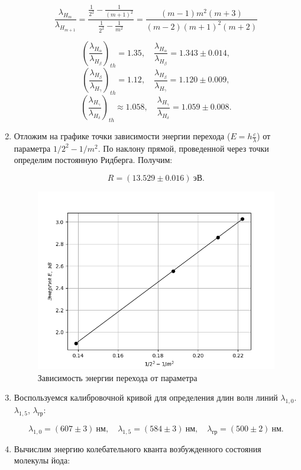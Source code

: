 \documentclass[14pt, a4paper]{report}
\begin{document}
\begin{enumerate}
\[\frac{\lambda_{H_m}}{\lambda_{H_{m+1}}}=\frac{\frac{1}{2^2}-\frac{1}{(m+1)^2}}{\frac{1}{2^2}-\frac{1}{m^2}}=\frac{(m-1)m^2(m+3)}{(m-2)(m+1)^2(m+2)}\]

\[\left(\frac{\lambda_{H_\alpha}}{\lambda_{H_\beta}}\right)_{th}=1.35,\quad\frac{\lambda_{H_\alpha}}{\lambda_{H_\beta}}=1.343\pm0.014,\]
\[\left(\frac{\lambda_{H_\beta}}{\lambda_{H_\gamma}}\right)_{th}=1.12,\quad\frac{\lambda_{H_\beta}}{\lambda_{H_\gamma}}=1.120\pm0.009,\]
\[\left(\frac{\lambda_{H_\gamma}}{\lambda_{H_\delta}}\right)_{th}\approx1.058,\quad\frac{\lambda_{H_\gamma}}{\lambda_{H_\delta}}=1.059\pm0.008.\]

\item Отложим на графике точки зависимости энергии перехода ($E=h\frac{c}{\lambda}$) от параметра $1/2^2-1/m^2$. По наклону прямой, проведенной через точки определим постоянную Ридберга. Получим:

\[R=(13.529\pm0.016)\ эВ.\]

\begin{figure}[H]
\centering
\includegraphics[scale=0.6]{../images/523-2}
\caption{Зависимость энергии перехода от параметра}
\end{figure}

\item Воспользуемся калибровочной кривой для определения длин волн линий $\lambda_{1,0}$. $\lambda_{1,5}$, $\lambda_{гр}$:

\[\lambda_{1,0}=(607\pm3)\ нм,\quad \lambda_{1,5}=(584\pm3)\ нм,\quad \lambda_{гр}=(500\pm2)\ нм.\]

\item Вычислим энергию колебательного кванта возбужденного состояния молекулы йода:


\end{enumerate}
\end{document}
